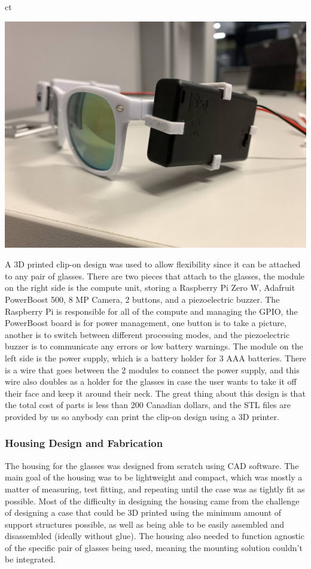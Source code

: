 ct\documentclass[a4paper,11pt]{article}
\begin{document}
\begin{center}
    \includegraphics[width={0.3\linewidth}]{img/glasses/right.jpg}
\end{center}

A 3D printed clip-on design was used to allow flexibility since it can be attached to any pair of glasses. There are two pieces that attach to the glasses, the module on the right side is the compute unit, storing a Raspberry Pi Zero W, Adafruit PowerBoost 500, 8 MP Camera, 2 buttons, and a piezoelectric buzzer. The Raspberry Pi is responsible for all of the compute and managing the GPIO, the PowerBoost board is for power management, one button is to take a picture, another is to switch between different processing modes, and the piezoelectric buzzer is to communicate any errors or low battery warnings. The module on the left side is the power supply, which is a battery holder for 3 AAA batteries. There is a wire that goes between the 2 modules to connect the power supply, and this wire also doubles as a holder for the glasses in case the user wants to take it off their face and keep it around their neck. The great thing about this design is that the total cost of parts is less than 200 Canadian dollars, and the STL files are provided by us so anybody can print the clip-on design using a 3D printer.

\subsubsection{Housing Design and Fabrication}
The housing for the glasses was designed from scratch using CAD software. The main goal of the housing was to be lightweight and compact, which was mostly a matter of measuring, test fitting, and repeating until the case was as tightly fit as possible. Most of the difficulty in designing the housing came from the challenge of designing a case that could be 3D printed using the minimum amount of support structures possible, as well as being able to be easily assembled and disassembled (ideally without glue). The housing also needed to function agnostic of the specific pair of glasses being used, meaning the mounting solution couldn't be integrated.
\end{document}
